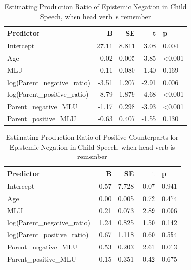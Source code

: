 \documentclass[
  english,
  man,floatsintext]{apa6}
\begin{document}
\begin{table}

\caption{\label{tab:unnamed-chunk-8}Estimating Production Ratio of Epistemic Negation in Child Speech, when head verb is remember}
\centering
\begin{tabular}[t]{l|r|r|r|l}
\hline
Predictor & B & SE & t & p\\
\hline
Intercept & 27.11 & 8.811 & 3.08 & 0.004\\
\hline
Age & 0.02 & 0.005 & 3.85 & <0.001\\
\hline
MLU & 0.11 & 0.080 & 1.40 & 0.169\\
\hline
log(Parent\_negative\_ratio) & -3.51 & 1.207 & -2.91 & 0.006\\
\hline
log(Parent\_positive\_ratio) & 8.79 & 1.879 & 4.68 & <0.001\\
\hline
Parent\_negative\_MLU & -1.17 & 0.298 & -3.93 & <0.001\\
\hline
Parent\_positive\_MLU & -0.63 & 0.407 & -1.55 & 0.130\\
\hline
\end{tabular}
\end{table}

\begin{table}

\caption{\label{tab:unnamed-chunk-8}Estimating Production Ratio of Positive Counterparts for Epistemic Negation in Child Speech, when head verb is remember}
\centering
\begin{tabular}[t]{l|r|r|r|l}
\hline
Predictor & B & SE & t & p\\
\hline
Intercept & 0.57 & 7.728 & 0.07 & 0.941\\
\hline
Age & 0.00 & 0.005 & 0.72 & 0.474\\
\hline
MLU & 0.21 & 0.073 & 2.89 & 0.006\\
\hline
log(Parent\_negative\_ratio) & 1.24 & 0.825 & 1.50 & 0.142\\
\hline
log(Parent\_positive\_ratio) & 0.67 & 1.118 & 0.60 & 0.554\\
\hline
Parent\_negative\_MLU & 0.53 & 0.203 & 2.61 & 0.013\\
\hline
Parent\_positive\_MLU & -0.15 & 0.351 & -0.42 & 0.675\\
\hline
\end{tabular}
\end{table}

\clearpage
\end{document}
